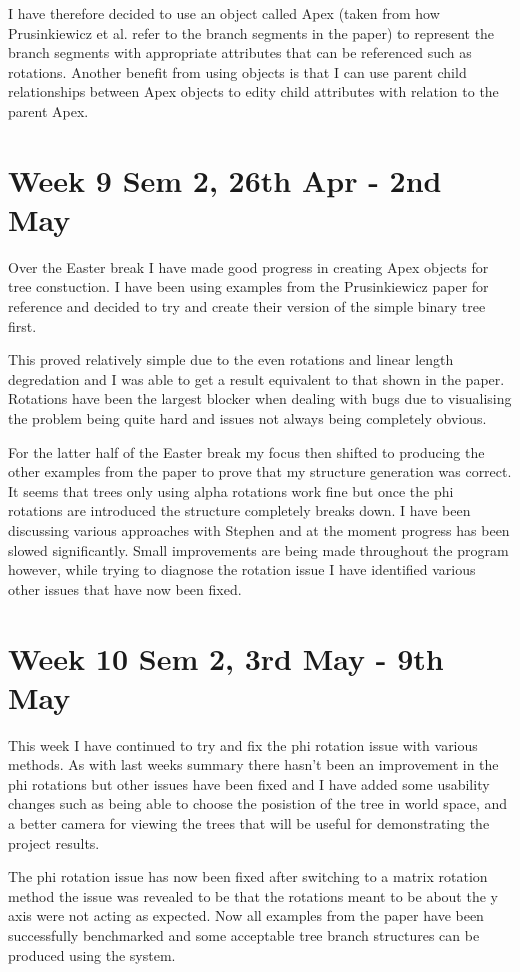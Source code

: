 \documentclass[11pt]{article}
\begin{document}
I have therefore decided to use an object called Apex (taken from how Prusinkiewicz et al. refer 
to the branch segments in the paper) to represent the branch segments with appropriate attributes 
that can be referenced such as rotations. Another benefit from using objects is that I can use 
parent child relationships between Apex objects to edity child attributes with relation to the 
parent Apex.

\section*{Week 9 Sem 2, 26th Apr - 2nd May}
Over the Easter break I have made good progress in creating Apex objects for tree constuction.
I have been using examples from the Prusinkiewicz paper for reference and decided to try and 
create their version of the simple binary tree first. 

This proved relatively simple due to the even rotations and linear length degredation and I was 
able to get a result equivalent to that shown in the paper. Rotations have been the largest blocker 
when dealing with bugs due to visualising the problem being quite hard and issues not always being 
completely obvious.

For the latter half of the Easter break my focus then shifted to producing the other examples from 
the paper to prove that my structure generation was correct. It seems that trees only using alpha 
rotations work fine but once the phi rotations are introduced the structure completely breaks down.
I have been discussing various approaches with Stephen and at the moment progress has been slowed 
significantly. Small improvements are being made throughout the program however, while trying to 
diagnose the rotation issue I have identified various other issues that have now been fixed.

\section*{Week 10 Sem 2, 3rd May - 9th May}
This week I have continued to try and fix the phi rotation issue with various methods. As with 
last weeks summary there hasn't been an improvement in the phi rotations but other issues have 
been fixed and I have added some usability changes such as being able to choose the posistion of 
the tree in world space, and a better camera for viewing the trees that will be useful for 
demonstrating the project results.

The phi rotation issue has now been fixed after switching to a matrix rotation method the issue 
was revealed to be that the rotations meant to be about the y axis were not acting as expected. 
Now all examples from the paper have been successfully benchmarked and some acceptable tree 
branch structures can be produced using the system.
\end{document}
